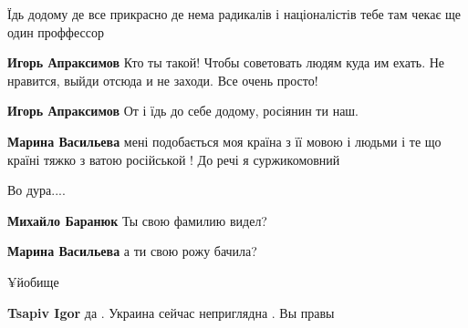 \begin{itemize}
Їдь додому де все прикрасно де нема радикалів і націоналістів тебе там чекає ще один проффессор

\begin{itemize}

\textbf{Игорь Апраксимов}
Кто ты такой! Чтобы советовать людям куда им ехать. Не нравится, выйди отсюда и не заходи.
Все очень просто!


\textbf{Игорь Апраксимов} От і їдь до себе додому, росіянин ти наш.


\textbf{Марина Васильева} мені подобається моя країна з її мовою і людьми і те що країні тяжко з ватою російськой ! До речі я суржикомовний
\end{itemize}


Во дура....

\begin{itemize}

\textbf{Михайло Баранюк}
Ты свою фамилию видел?


\textbf{Марина Васильева} а ти свою рожу бачила?
\end{itemize}


¥йобище

\begin{itemize}

\textbf{Tsapiv Igor} да . Украина сейчас неприглядна . Вы правы



\end{itemize}
\end{itemize}

